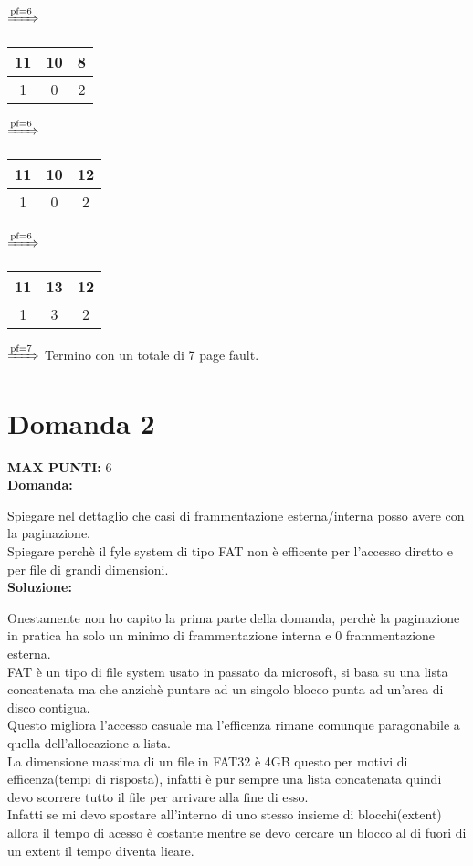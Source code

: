\documentclass{article}
\begin{document}
\begin{itemize}
\begin{tabular}{|c|c|c|}
            \hline
        \end{tabular}
        $\xRightarrow{\text{pf}=6}$
        \begin{tabular}{|c|c|c|}
            \hline
            11 & 10 & 8\\
            \hline
            1 & 0 & 2\\
            \hline
        \end{tabular}
        $\xRightarrow{\text{pf}=6}$
        \begin{tabular}{|c|c|c|}
            \hline
            11 & 10 & 12\\
            \hline
            1 & 0 & 2\\
            \hline
        \end{tabular}
        $\xRightarrow{\text{pf}=6}$
        \begin{tabular}{|c|c|c|}
            \hline
            11 & 13 & 12\\
            \hline
            1 & 3 & 2\\
            \hline
        \end{tabular}
        $\xRightarrow{\text{pf}=7}$
        Termino con un totale di 7 page fault.
    \end{itemize}
    \section*{Domanda 2}
    \textbf{MAX PUNTI:} 6\\
    \textbf{Domanda:}

    Spiegare nel dettaglio che casi di frammentazione esterna/interna posso avere con la paginazione.\\
    Spiegare perchè il fyle system di tipo FAT non è efficente per l'accesso diretto e per file di grandi dimensioni.\\
    \textbf{Soluzione:}


    Onestamente non ho capito la prima parte della domanda, perchè la paginazione in pratica ha solo un minimo di frammentazione interna e 0 frammentazione esterna.\\
    FAT è un tipo di file system usato in passato da microsoft, si basa su una lista concatenata ma che anzichè puntare ad un singolo blocco punta ad un'area di disco contigua.\\
    Questo migliora l'accesso casuale ma l'efficenza rimane comunque paragonabile a quella dell'allocazione a lista.\\
    La dimensione massima di un file in FAT32 è 4GB questo per motivi di efficenza(tempi di risposta), infatti è pur sempre una lista concatenata quindi devo scorrere tutto il file per arrivare alla fine di esso.\\
    Infatti se mi devo spostare all'interno di uno stesso insieme di blocchi(extent) allora il tempo di acesso è costante mentre se devo cercare un blocco al di fuori di un extent il tempo diventa lieare.
\end{document}
